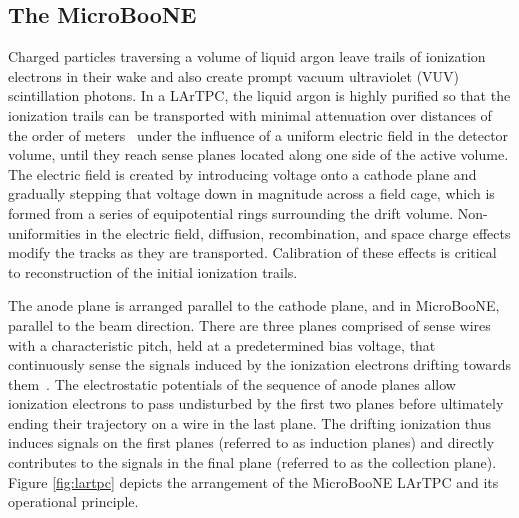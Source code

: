 \subsection{The MicroBooNE \lartpc}

Charged particles traversing a volume of liquid argon leave trails of ionization electrons in their wake and also create prompt vacuum ultraviolet (VUV) scintillation photons.  In a LArTPC, the liquid argon is highly purified so that the ionization trails can be transported with minimal attenuation over distances of the order of meters~\cite{Aprile:1985} under the influence of a uniform electric field in the detector volume, until they reach sense planes located along one side of the active volume.   The electric field is created by introducing voltage onto a cathode plane and gradually stepping that voltage down in magnitude across a field cage, which is formed from a series of equipotential rings surrounding the drift volume.   Non-uniformities in the electric field, diffusion, recombination, and space charge effects modify the tracks as they are transported.  Calibration of these effects is critical to reconstruction of the initial ionization trails.   

The anode plane is arranged parallel to the cathode plane, and in MicroBooNE, parallel to the beam direction.   There are three planes comprised of sense wires with a characteristic pitch, held at a predetermined bias voltage, that continuously sense the signals induced by the ionization electrons drifting towards them~\cite{Gatti:1979fba}. The electrostatic potentials of the sequence of anode planes allow ionization electrons to pass undisturbed by the first two planes before ultimately ending their trajectory on a wire in the last plane. The drifting ionization thus induces signals on the first planes (referred to as induction planes) and directly contributes to the signals in the final plane (referred to as the collection plane).  Figure \ref{fig:lartpc} depicts the arrangement of the MicroBooNE LArTPC and its operational principle.


